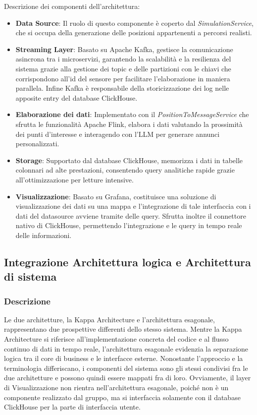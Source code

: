\documentclass[10pt]{article}
\begin{document}
Descrizione dei componenti dell'architettura:
\begin{itemize}
    \item \textbf{Data Source}: Il ruolo di questo componente è coperto dal \textit{SimulationService}, che si occupa della generazione delle posizioni appartenenti a percorsi realisti.
    \item \textbf{Streaming Layer}: Basato su Apache Kafka, gestisce la comunicazione asincrona tra i microservizi, garantendo la scalabilità e la resilienza del sistema grazie alla gestione dei topic e delle partizioni con le chiavi che corrispondono all'id del sensore per facilitare l'elaborazione in maniera parallela. Infine Kafka è responsabile della storicizzazione dei log nelle apposite entry del database ClickHouse.
    \item \textbf{Elaborazione dei dati}: Implementato con il \textit{PositionToMessageService} che sfrutta le funzionalità Apache Flink, elabora i dati valutando la prossimità dei punti d’interesse e interagendo con l’LLM per generare annunci personalizzati.
    \item \textbf{Storage}: Supportato dal database ClickHouse, memorizza i dati in tabelle colonnari ad alte prestazioni, consentendo query analitiche rapide grazie all’ottimizzazione per letture intensive.
    \item \textbf{Visualizzazione}: Basato su Grafana, costituisce una soluzione di visualizzazione dei dati su una mappa e l'integrazione di tale interfaccia con i dati del datasource avviene tramite delle query. Sfrutta inoltre il connettore nativo di ClickHouse, permettendo l'integrazione e le query in tempo reale delle informazioni.
\end{itemize}




\subsection{Integrazione Architettura logica e Architettura di sistema}
\subsubsection{Descrizione}
Le due architetture, la Kappa Architecture e l'architettura esagonale, rappresentano due prospettive differenti dello stesso sistema.
Mentre la Kappa Architecture si riferisce all’implementazione concreta del codice e al flusso continuo di dati in tempo reale, l’architettura esagonale evidenzia la separazione logica tra il core di business e le interfacce esterne.
Nonostante l'approccio e la terminologia differiscano, i componenti  del sistema sono gli stessi condivisi fra le due architetture e possono quindi essere mappati fra di loro.
Ovviamente, il layer di Visualizzazione non rientra nell'architettura esagonale, poiché non è un componente realizzato dal gruppo, ma si interfaccia solamente con il database ClickHouse per la parte di interfaccia utente.
\end{document}

